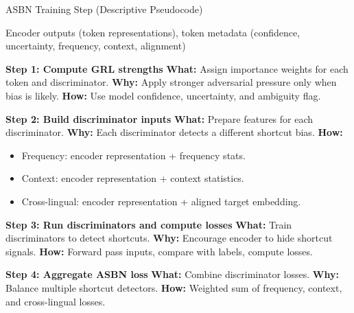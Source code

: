 \documentclass[11pt]{article}
\begin{document}
\begin{algorithm}[H]
\caption{ASBN Training Step (Descriptive Pseudocode)}
\label{alg:asbn_descriptive}
\begin{algorithmic}[1]

\Require Encoder outputs (token representations), token metadata (confidence, uncertainty, frequency, context, alignment)

\State \textbf{Step 1: Compute GRL strengths} 
\State \hspace{0.5cm} \textbf{What:} Assign importance weights for each token and discriminator. 
\State \hspace{0.5cm} \textbf{Why:} Apply stronger adversarial pressure only when bias is likely. 
\State \hspace{0.5cm} \textbf{How:} Use model confidence, uncertainty, and ambiguity flag.

\State \textbf{Step 2: Build discriminator inputs} 
\State \hspace{0.5cm} \textbf{What:} Prepare features for each discriminator. 
\State \hspace{0.5cm} \textbf{Why:} Each discriminator detects a different shortcut bias. 
\State \hspace{0.5cm} \textbf{How:} 
    \begin{itemize}
        \item Frequency: encoder representation + frequency stats.
        \item Context: encoder representation + context statistics.
        \item Cross-lingual: encoder representation + aligned target embedding.
    \end{itemize}

\State \textbf{Step 3: Run discriminators and compute losses} 
\State \hspace{0.5cm} \textbf{What:} Train discriminators to detect shortcuts. 
\State \hspace{0.5cm} \textbf{Why:} Encourage encoder to hide shortcut signals. 
\State \hspace{0.5cm} \textbf{How:} Forward pass inputs, compare with labels, compute losses.

\State \textbf{Step 4: Aggregate ASBN loss} 
\State \hspace{0.5cm} \textbf{What:} Combine discriminator losses. 
\State \hspace{0.5cm} \textbf{Why:} Balance multiple shortcut detectors. 
\State \hspace{0.5cm} \textbf{How:} Weighted sum of frequency, context, and cross-lingual losses.


\end{algorithmic}
\end{algorithm}
\end{document}
